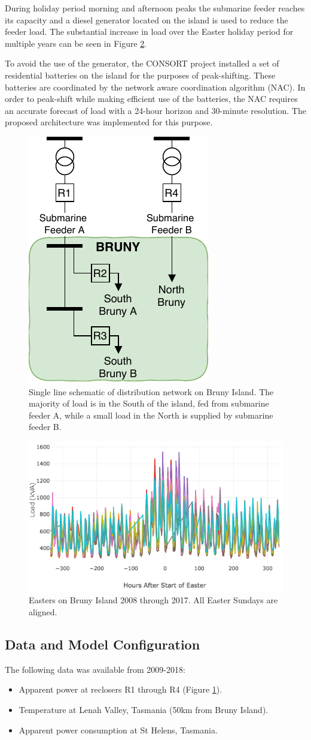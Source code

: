 \documentclass[conference]{IEEEtran}
\begin{document}
During holiday period morning and afternoon peaks the submarine feeder reaches its capacity and a diesel generator located on the island is used to reduce the feeder load.
The substantial increase in load over the Easter holiday period for multiple years can be seen in Figure \ref{fig:bruny_easter}.

To avoid the use of the generator, the CONSORT project installed a set of residential batteries on the island for the purposes of peak-shifting.
These batteries are coordinated by the network aware coordination algorithm (NAC).
In order to peak-shift while making efficient use of the batteries, the NAC requires an accurate forecast of load with a 24-hour horizon and 30-minute resolution.
The proposed architecture was implemented for this purpose.

\begin{figure}[htbp]
	\centerline{\includegraphics[width=.2\textwidth]{images/bruny_single_line.pdf}}
	\caption{Single line schematic of distribution network on Bruny Island.
			 The majority of load is in the South of the island, fed from submarine feeder A, while a small load in the North is supplied by submarine feeder B.}
	\label{fig:bruny_network}
\end{figure}

\begin{figure}[htbp]
	\centerline{\includegraphics[width=.35\textwidth]{images/easter_bruny.png}}
	\caption{Easters on Bruny Island 2008 through 2017. All Easter Sundays are aligned.}
	\label{fig:bruny_easter}
\end{figure}

\subsection{Data and  Model Configuration}
The following data was available from 2009-2018:
\begin{itemize}
	\item Apparent power at reclosers R1 through R4 (Figure \ref{fig:bruny_network}).
	\item Temperature at Lenah Valley, Tasmania (50km from Bruny Island). 
	\item Apparent power consumption at St Helens, Tasmania.
\end{itemize}
\end{document}

